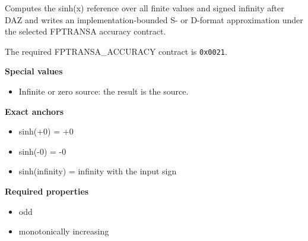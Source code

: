 Computes the sinh(x) reference over all finite values and signed infinity after DAZ and writes an implementation-bounded S- or D-format approximation under the selected FPTRANSA accuracy contract.

The required FPTRANSA\_ACCURACY contract is \texttt{0x0021}.

\textbf{Special values}\par
\begin{itemize}
\item Infinite or zero source: the result is the source.
\end{itemize}

\textbf{Exact anchors}\par
\begin{itemize}
\item sinh(+0) = +0
\item sinh(-0) = -0
\item sinh(infinity) = infinity with the input sign
\end{itemize}

\textbf{Required properties}\par
\begin{itemize}
\item odd
\item monotonically increasing
\end{itemize}
